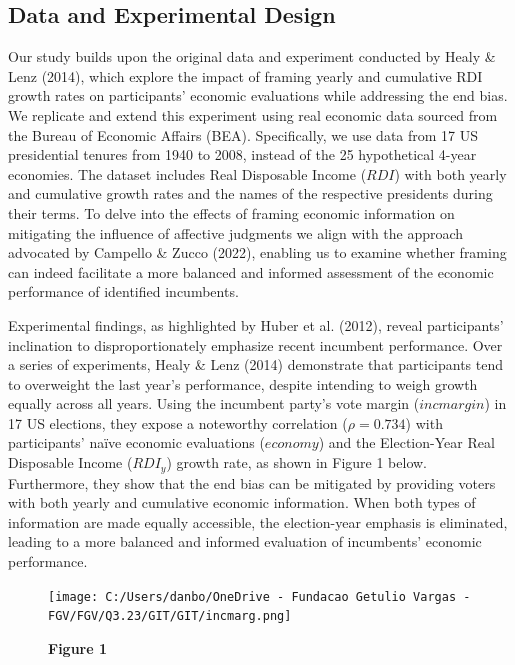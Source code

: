 \documentclass[
]{article}
\begin{document}
\hypertarget{data-and-experimental-design}{%
\subsection{Data and Experimental
Design}\label{data-and-experimental-design}}

Our study builds upon the original data and experiment conducted by
Healy \& Lenz (2014), which explore the impact of framing yearly and
cumulative RDI growth rates on participants' economic evaluations while
addressing the end bias. We replicate and extend this experiment using
real economic data sourced from the Bureau of Economic Affairs (BEA).
Specifically, we use data from 17 US presidential tenures from 1940 to
2008, instead of the 25 hypothetical 4-year economies. The dataset
includes Real Disposable Income (\(RDI\)) with both yearly and
cumulative growth rates and the names of the respective presidents
during their terms. To delve into the effects of framing economic
information on mitigating the influence of affective judgments we align
with the approach advocated by Campello \& Zucco (2022), enabling us to
examine whether framing can indeed facilitate a more balanced and
informed assessment of the economic performance of identified
incumbents.

Experimental findings, as highlighted by Huber et al. (2012), reveal
participants' inclination to disproportionately emphasize recent
incumbent performance. Over a series of experiments, Healy \& Lenz
(2014) demonstrate that participants tend to overweight the last year's
performance, despite intending to weigh growth equally across all years.
Using the incumbent party's vote margin (\(incmargin\)) in 17 US
elections, they expose a noteworthy correlation (\(\rho = 0.734\)) with
participants' naïve economic evaluations (\(economy\)) and the
Election-Year Real Disposable Income (\(RDI_y\)) growth rate, as shown
in Figure 1 below. Furthermore, they show that the end bias can be
mitigated by providing voters with both yearly and cumulative economic
information. When both types of information are made equally accessible,
the election-year emphasis is eliminated, leading to a more balanced and
informed evaluation of incumbents' economic performance.

\begin{figure}
\centering
\texttt{[image: C:/Users/danbo/OneDrive - Fundacao Getulio Vargas - FGV/FGV/Q3.23/GIT/GIT/incmarg.png]}
\caption{\textbf{Figure 1}}
\end{figure}
\end{document}
